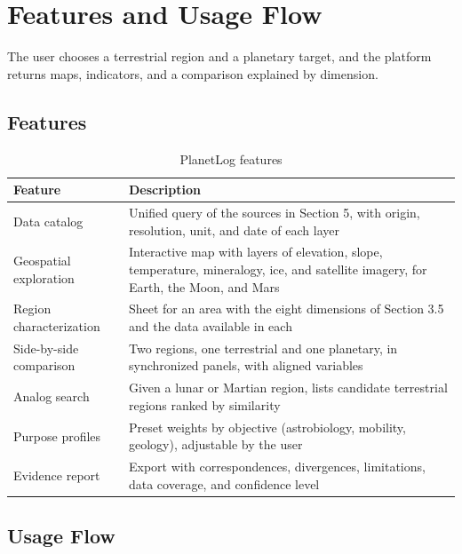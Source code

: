 \documentclass[12pt,letterpaper]{article}
\begin{document}
\section{Features and Usage Flow}

The user chooses a terrestrial region and a planetary target, and the platform returns maps, indicators, and a comparison explained by dimension.

\subsection{Features}

\begin{table}[htbp]
\centering
\caption{PlanetLog features}
\small
\begin{tabularx}{\textwidth}{>{\raggedright\arraybackslash}p{3.8cm} >{\raggedright\arraybackslash}X}
\toprule
\textbf{Feature} & \textbf{Description} \\
\midrule
Data catalog & Unified query of the sources in Section 5, with origin, resolution, unit, and date of each layer \\
Geospatial exploration & Interactive map with layers of elevation, slope, temperature, mineralogy, ice, and satellite imagery, for Earth, the Moon, and Mars \\
Region characterization & Sheet for an area with the eight dimensions of Section 3.5 and the data available in each \\
Side-by-side comparison & Two regions, one terrestrial and one planetary, in synchronized panels, with aligned variables \\
Analog search & Given a lunar or Martian region, lists candidate terrestrial regions ranked by similarity \\
Purpose profiles & Preset weights by objective (astrobiology, mobility, geology), adjustable by the user \\
Evidence report & Export with correspondences, divergences, limitations, data coverage, and confidence level \\
\bottomrule
\end{tabularx}
\end{table}

\subsection{Usage Flow}
\end{document}
